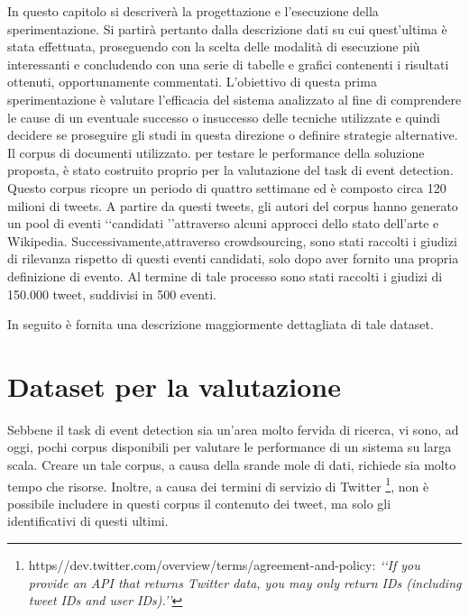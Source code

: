

In questo capitolo si descriverà la progettazione e l'esecuzione della sperimentazione. Si partirà pertanto dalla descrizione dati su cui quest'ultima è stata effettuata, proseguendo con la scelta delle modalità di esecuzione più interessanti e concludendo con una serie di tabelle e grafici contenenti i risultati ottenuti, opportunamente commentati.  
L'obiettivo di questa prima sperimentazione è valutare l'efficacia del sistema analizzato al fine di comprendere le cause di un eventuale successo o insuccesso delle tecniche utilizzate e quindi decidere se proseguire gli studi in questa direzione o definire strategie alternative.
Il corpus di documenti utilizzato\cite{McMinn:2013:BLC:2505515.2505695}. per testare le performance della soluzione proposta, è stato costruito proprio per la valutazione del task di event detection. Questo corpus ricopre un periodo di quattro settimane ed è composto circa 120 milioni di tweets. A partire da questi tweets, gli autori del corpus hanno generato un pool di eventi \lq\lq candidati \rq\rq attraverso alcuni approcci dello stato dell'arte e Wikipedia. Successivamente,attraverso crowdsourcing, sono stati raccolti i giudizi di rilevanza rispetto di questi eventi candidati, solo dopo aver fornito una propria definizione di evento.
Al termine di tale processo sono stati raccolti i giudizi di 150.000 tweet, suddivisi in 500 eventi. 

In seguito è fornita una descrizione maggiormente dettagliata di tale dataset.
\section{Dataset per la valutazione}


Sebbene il task di event detection sia un'area molto fervida di ricerca, vi sono, ad oggi, pochi corpus disponibili per valutare le performance di un sistema su larga scala. Creare un tale corpus, a causa della srande mole di dati, richiede sia molto tempo che risorse. Inoltre, a causa dei termini di servizio di Twitter
\footnote{https//dev.twitter.com/overview/terms/agreement-and-policy: \emph{\lq\lq If you provide an API that returns Twitter data, you may only return IDs (including tweet IDs and user IDs).\rq\rq}},
 non è possibile includere in questi corpus il contenuto dei tweet, ma solo gli identificativi di questi ultimi.

